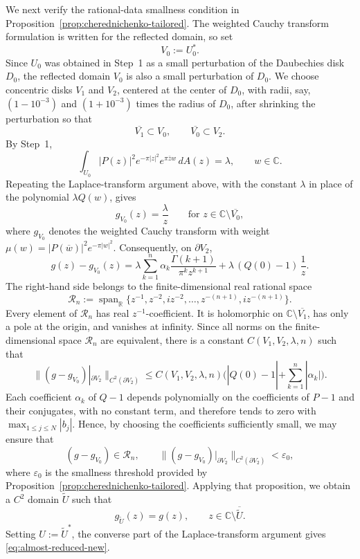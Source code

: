 \documentclass[a4paper,11pt,reqno]{amsart}
\numberwithin{equation}{section}
\theoremstyle{plain} %
\theoremstyle{definition} %
\theoremstyle{remark}
\newcommand{\R}{\mathbb{R}}
\newcommand{\C}{\mathbb{C}}
\begin{document}
We next verify the rational-data smallness condition in Proposition~\ref{prop:cherednichenko-tailored}. The weighted Cauchy transform formulation is written for the reflected domain, so set
\[
V_0:=U_0^\ast.
\]
Since \(U_0\) was obtained in Step~1 as a small perturbation of the Daubechies disk \(D_0\), the reflected domain \(V_0\) is also a small perturbation of \(D_0\). We choose concentric disks \(V_1\) and \(V_2\), centered at the center of \(D_0\), with radii, say, \((1-10^{-3})\) and \((1+10^{-3})\) times the radius of \(D_0\), after shrinking the perturbation so that
\[
\overline{V_1}\subset V_0,\qquad \overline{V_0}\subset V_2 .
\]
By Step~1,
\[
\int_{U_0}|P(z)|^2e^{-\pi|z|^2}e^{\pi \overline zw}\,dA(z)=\lambda,
\qquad w\in \C.
\]
Repeating the Laplace-transform argument above, with the constant $\lambda$ in place of the polynomial $\lambda Q(w)$, gives
\[
g_{V_0}(z)=\frac{\lambda}{z}
\qquad \text{for } z\in \C\setminus \overline{V_0},
\]
where \(g_{V_0}\) denotes the weighted Cauchy transform with weight \(\mu(w)=|P(\overline w)|^2e^{-\pi|w|^2}\). Consequently, on \(\partial V_2\),
\[
g(z)-g_{V_0}(z)
=
\lambda \sum_{k=1}^n \alpha_k \frac{\Gamma(k+1)}{\pi^k z^{k+1}}
+
\lambda\,(Q(0)-1)\,\frac1z .
\]
The right-hand side belongs to the finite-dimensional real rational space
\[
\mathcal R_n:=\operatorname{span}_{\R}
\{z^{-1},z^{-2},iz^{-2},\ldots,z^{-(n+1)},iz^{-(n+1)}\}.
\]
Every element of \(\mathcal R_n\) has real \(z^{-1}\)-coefficient. It is
holomorphic on \(\C\setminus\overline{V_1}\), has only a pole at the origin,
and vanishes at infinity. Since all norms on the finite-dimensional
space \(\mathcal R_n\) are equivalent, there is a constant
\(C(V_1,V_2,\lambda,n)\) such that
\[
\big\|(g-g_{V_0})|_{\partial V_2}\big\|_{C^2(\partial V_2)}
\le
C(V_1,V_2,\lambda,n)
\Big(|Q(0)-1|+\sum_{k=1}^n |\alpha_k|\Big).
\]
Each coefficient \(\alpha_k\) of \(Q-1\) depends polynomially on the
coefficients of \(P-1\) and their conjugates, with no constant term, and
therefore tends to zero with \(\max_{1\le j\le N}|b_j|\). Hence, by choosing
the coefficients sufficiently small, we may ensure that
\[
(g-g_{V_0})\in\mathcal R_n,
\qquad
\big\|(g-g_{V_0})|_{\partial V_2}\big\|_{C^2(\partial V_2)}<\varepsilon_0,
\]
where \(\varepsilon_0\) is the smallness threshold provided by Proposition~\ref{prop:cherednichenko-tailored}. Applying that proposition, we obtain a \(C^2\) domain \(\widetilde U\) such that
\[
g_{\widetilde U}(z)=g(z),
\qquad z\in \C\setminus \overline{\widetilde U}.
\]
Setting \(U:=\widetilde U^\ast\), the converse part of the Laplace-transform argument gives \eqref{eq:almost-reduced-new}.
\end{document}
